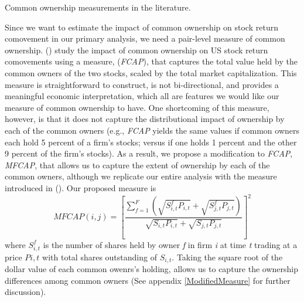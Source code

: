 	{\begin{table}[htbp]
			\centering
			\scriptsize
			\caption{ Common ownership measurements in the literature.}
			\label{maasurmentsSummary}
			\resizebox{\textwidth}{!}{
				
			}
		\end{table}
	}
	
Since we want to estimate the impact of common ownership on stock return comovement in our primary analysis, we need a pair-level measure of common ownership. (\cite{AntonPolk}) study the impact of common ownership on US stock return comovements using a measure, (\textit{FCAP}), that captures the total value held by the common owners of the two stocks, scaled by the total market capitalization. This measure is straightforward to construct, is not bi-directional, and provides a meaningful economic interpretation, which all are features we would like our measure of common ownership to have. One shortcoming of this measure, however, is that it does not capture the distributional impact of ownership by each of the common owners (e.g., \textit{FCAP} yields the same values if common owners each hold 5 percent of a firm's stocks; versus if one holds 1 percent and the other 9 percent of the firm's stocks). As a result, we propose a modification to \textit{FCAP}, \textit{MFCAP}, that allows us to capture the extent of ownership by each of the common owners, although we replicate our entire analysis with the measure introduced in (\cite{AntonPolk}). Our proposed measure is
\begin{equation}
	MFCAP(i, j) =  [\frac{\sum_{f =1}^{F}(\sqrt{S^f_{i,t}P_{i,t}}+\sqrt{S^f_{j,t}P_{j,t}})}{\sqrt{S_{i,t}P_{i,t}} + \sqrt{S_{j,t}P_{j,t}}}]^2 
	\label{sqrt}
\end{equation}
where $ S^f_{i,t}$ is the number of shares held by owner \textit{f} in firm \textit{i} at time \textit{t} trading at a price $ P{i,t} $ with total shares outstanding of $ S_{i,t} $. Taking the square root of the dollar value of each common owenrs's holding, allows us to capture the ownership differences among common owners ({See appendix \ref{ModifiedMeasure}} for further discussion). 


